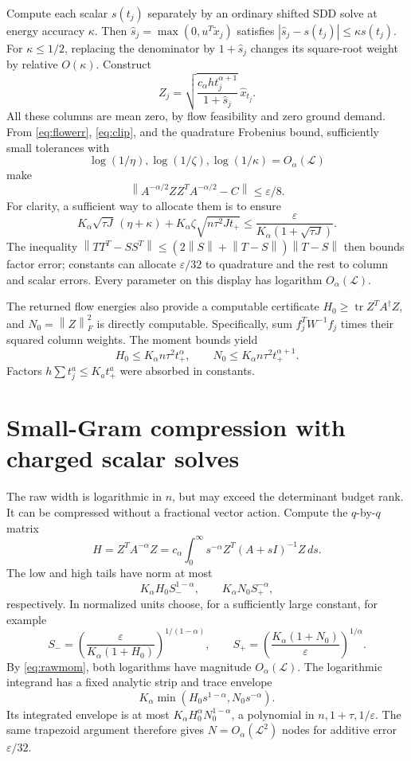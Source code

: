 \documentclass[11pt]{article}
\newcommand{\tr}{\operatorname{tr}}
\newcommand{\norm}[1]{\left\lVert#1\right\rVert}
\begin{document}
Compute each scalar $s(t_j)$ separately by an ordinary shifted SDD
solve at energy accuracy $\kappa$. Then
$\widehat s_j=\max(0,u^T\widetilde x_j)$ satisfies
$|\widehat s_j-s(t_j)|\le\kappa s(t_j)$.
For $\kappa\le1/2$, replacing the denominator by $1+\widehat s_j$
changes its square-root weight by relative $O(\kappa)$.
Construct
\[
 Z_j=\sqrt{\frac{c_\alpha h t_j^{\alpha+1}}{1+\widehat s_j}}
         \,\widehat x_{t_j}.
\]
All these columns are mean zero, by flow feasibility and zero ground
demand. From \eqref{eq:flowerr}, \eqref{eq:clip}, and the quadrature
Frobenius bound, sufficiently small tolerances with
\[
 \log(1/\eta),\log(1/\zeta),\log(1/\kappa)
       =O_\alpha(\mathcal L)
\]
make
\begin{equation}\label{eq:raw}
 \norm{A^{-\alpha/2}ZZ^TA^{-\alpha/2}-C}\le\varepsilon/8.
\end{equation}
For clarity, a sufficient way to allocate them is to ensure
\[
 K_\alpha\sqrt{\tau J}\,(\eta+\kappa)
 +K_\alpha\zeta\sqrt{n\tau^2Jt_+}
 \le \frac{\varepsilon}{K_\alpha(1+\sqrt{\tau J})}.
\]
The inequality $\norm{TT^T-SS^T}\le
(2\norm S+\norm{T-S})\norm{T-S}$ then bounds factor error;
constants can allocate $\varepsilon/32$ to quadrature and the rest to
column and scalar errors. Every parameter on this display has
logarithm $O_\alpha(\mathcal L)$.

The returned flow energies also provide a computable certificate
$H_0\ge\tr Z^TA^\dagger Z$, and $N_0=\norm Z_F^2$ is directly
computable. Specifically, sum $f_j^TW^{-1}f_j$ times their squared
column weights. The moment bounds yield
\begin{equation}\label{eq:rawmom}
 H_0\le K_\alpha n\tau^2t_+^\alpha,
 \qquad N_0\le K_\alpha n\tau^2t_+^{\alpha+1}.
\end{equation}
Factors $h\sum t_j^a\le K_a t_+^a$ were absorbed in constants.

\section{Small-Gram compression with charged scalar solves}
The raw width is logarithmic in $n$, but may exceed the determinant
budget rank. It can be compressed without a fractional vector action.
Compute the $q$-by-$q$ matrix
\begin{equation}\label{eq:gram}
 H=Z^TA^{-\alpha}Z
   =c_\alpha\int_0^\infty s^{-\alpha}Z^T(A+sI)^{-1}Z\,ds.
\end{equation}
The low and high tails have norm at most
\[
 K_\alpha H_0 S_-^{1-\alpha},\qquad
 K_\alpha N_0 S_+^{-\alpha},
\]
respectively. In normalized units choose, for a sufficiently large
constant, for example
\[
 S_- =\left(\frac{\varepsilon}{K_\alpha(1+H_0)}\right)^{1/(1-\alpha)},
 \qquad
 S_+ =\left(\frac{K_\alpha(1+N_0)}\varepsilon\right)^{1/\alpha}.
\]
By \eqref{eq:rawmom}, both logarithms have magnitude
$O_\alpha(\mathcal L)$.
The logarithmic integrand has a fixed analytic strip and trace envelope
\[
 K_\alpha\min(H_0s^{1-\alpha},N_0s^{-\alpha}).
\]
Its integrated envelope is at most
$K_\alpha H_0^\alpha N_0^{1-\alpha}$, a polynomial in
$n,1+\tau,1/\varepsilon$. The same trapezoid argument therefore
gives $N=O_\alpha(\mathcal L^2)$ nodes for additive error
$\varepsilon/32$.
\end{document}
